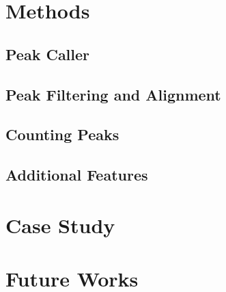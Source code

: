 \documentclass[b5paper,oneside,british,intoc,bibliograph=totoc,index=totoc,BCOR10mm,twoside,openright]{book}
\numberwithin{equation}{section}
\numberwithin{figure}{section}
\begin{document}
\section{Methods} \label{sec:descan2methods}


\subsection{Peak Caller} \label{sec:descan2peakcall}


\subsection{Peak Filtering and Alignment} \label{sec:descan2filtering}


\subsection{Counting Peaks} \label{sec:descan2peakcounts}


\subsection{Additional Features} \label{sec:descan2addfeat}


\section{Case Study} \label{sec:descan2results}


\section{Future Works} \label{sec:descan2next}


\end{document}
